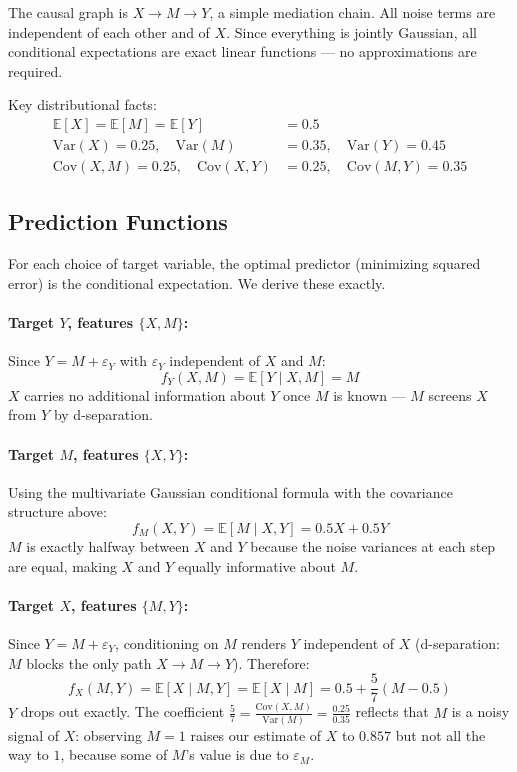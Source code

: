 \documentclass[12pt]{article}
\begin{document}
The causal graph is $X \to M \to Y$, a simple mediation chain. All noise terms are
independent of each other and of $X$. Since everything is jointly Gaussian, all conditional
expectations are exact linear functions --- no approximations are required.

Key distributional facts:
\begin{align}
\mathbb{E}[X] = \mathbb{E}[M] = \mathbb{E}[Y] &= 0.5 \\
\text{Var}(X) = 0.25, \quad \text{Var}(M) &= 0.35, \quad \text{Var}(Y) = 0.45 \\
\text{Cov}(X,M) = 0.25, \quad \text{Cov}(X,Y) &= 0.25, \quad \text{Cov}(M,Y) = 0.35
\end{align}

\subsection{Prediction Functions}

For each choice of target variable, the optimal predictor (minimizing squared error) is the
conditional expectation. We derive these exactly.

\paragraph{Target $Y$, features $\{X, M\}$:}
Since $Y = M + \varepsilon_Y$ with $\varepsilon_Y$ independent of $X$ and $M$:
\begin{equation}
f_Y(X, M) = \mathbb{E}[Y \mid X, M] = M
\end{equation}
$X$ carries no additional information about $Y$ once $M$ is known --- $M$ screens $X$ from
$Y$ by d-separation.

\paragraph{Target $M$, features $\{X, Y\}$:}
Using the multivariate Gaussian conditional formula with the covariance structure above:
\begin{equation}
f_M(X, Y) = \mathbb{E}[M \mid X, Y] = 0.5X + 0.5Y
\end{equation}
$M$ is exactly halfway between $X$ and $Y$ because the noise variances at each step are equal,
making $X$ and $Y$ equally informative about $M$.

\paragraph{Target $X$, features $\{M, Y\}$:}
Since $Y = M + \varepsilon_Y$, conditioning on $M$ renders $Y$ independent of $X$
(d-separation: $M$ blocks the only path $X \to M \to Y$). Therefore:
\begin{equation}
f_X(M, Y) = \mathbb{E}[X \mid M, Y] = \mathbb{E}[X \mid M]
= 0.5 + \frac{5}{7}(M - 0.5)
\end{equation}
$Y$ drops out exactly. The coefficient $\frac{5}{7} = \frac{\text{Cov}(X,M)}{\text{Var}(M)}
= \frac{0.25}{0.35}$ reflects that $M$ is a noisy signal of $X$: observing $M=1$ raises our
estimate of $X$ to $0.857$ but not all the way to $1$, because some of $M$'s value is due
to $\varepsilon_M$.
\end{document}
